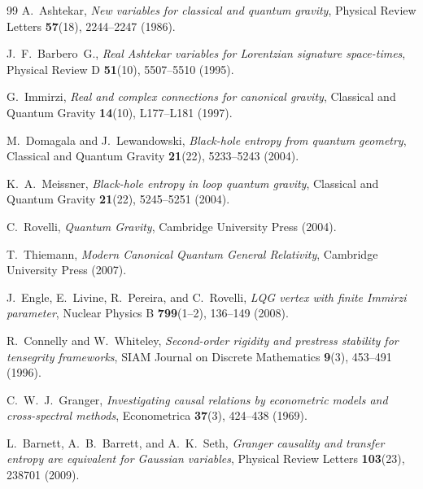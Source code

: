 \documentclass[12pt,a4paper]{article}
\theoremstyle{plain}
\theoremstyle{definition}
\theoremstyle{remark}
\begin{document}
\begin{thebibliography}{99}
A.~Ashtekar,
\textit{New variables for classical and quantum gravity},
Physical Review Letters \textbf{57}(18), 2244--2247 (1986).

J.~F.~Barbero~G.,
\textit{Real Ashtekar variables for Lorentzian signature space-times},
Physical Review D \textbf{51}(10), 5507--5510 (1995).

G.~Immirzi,
\textit{Real and complex connections for canonical gravity},
Classical and Quantum Gravity \textbf{14}(10), L177--L181 (1997).

M.~Domagala and J.~Lewandowski,
\textit{Black-hole entropy from quantum geometry},
Classical and Quantum Gravity \textbf{21}(22), 5233--5243 (2004).

K.~A.~Meissner,
\textit{Black-hole entropy in loop quantum gravity},
Classical and Quantum Gravity \textbf{21}(22), 5245--5251 (2004).

C.~Rovelli,
\textit{Quantum Gravity},
Cambridge University Press (2004).

T.~Thiemann,
\textit{Modern Canonical Quantum General Relativity},
Cambridge University Press (2007).

J.~Engle, E.~Livine, R.~Pereira, and C.~Rovelli,
\textit{LQG vertex with finite Immirzi parameter},
Nuclear Physics B \textbf{799}(1--2), 136--149 (2008).

R.~Connelly and W.~Whiteley,
\textit{Second-order rigidity and prestress stability for tensegrity frameworks},
SIAM Journal on Discrete Mathematics \textbf{9}(3), 453--491 (1996).

C.~W.~J.~Granger,
\textit{Investigating causal relations by econometric models and cross-spectral methods},
Econometrica \textbf{37}(3), 424--438 (1969).

L.~Barnett, A.~B.~Barrett, and A.~K.~Seth,
\textit{Granger causality and transfer entropy are equivalent for Gaussian variables},
Physical Review Letters \textbf{103}(23), 238701 (2009).

\end{thebibliography}
\end{document}
